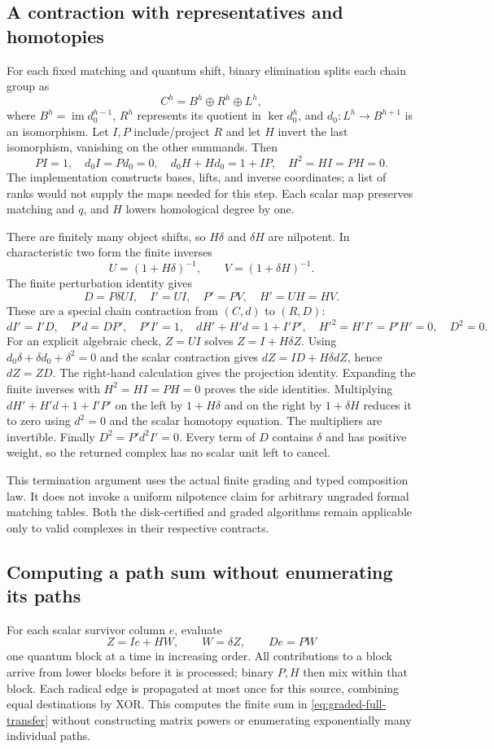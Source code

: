 \subsection{A contraction with representatives and homotopies}
For each fixed matching and quantum shift, binary elimination splits each
chain group as
\[
 C^h=B^h\oplus R^h\oplus L^h,
\]
where $B^h=\operatorname{im}d_0^{h-1}$, $R^h$ represents its quotient
in $\ker d_0^h$, and $d_0:L^h\to B^{h+1}$ is an isomorphism.
Let $I,P$ include/project $R$ and let $H$ invert the last isomorphism,
vanishing on the other summands.  Then
\[
 PI=1,\quad d_0I=Pd_0=0,\quad d_0H+Hd_0=1+IP,
 \quad H^2=HI=PH=0.
\]
The implementation constructs bases, lifts, and inverse coordinates; a
list of ranks would not supply the maps needed for this step.  Each scalar
map preserves matching and $q$, and $H$ lowers homological degree by one.

There are finitely many object shifts, so $H\delta$ and $\delta H$ are
nilpotent.  In characteristic two form the finite inverses
\[
 U=(1+H\delta)^{-1},\qquad V=(1+\delta H)^{-1}.
\]
The finite perturbation identity \cite{crainic-perturbation} gives
\begin{equation}
 D=P\delta UI,\quad I'=UI,\quad P'=PV,\quad H'=UH=HV.
 \label{eq:graded-full-transfer}
\end{equation}
These are a special chain contraction from $(C,d)$ to $(R,D)$:
\[
 dI'=I'D,\quad P'd=DP',\quad P'I'=1,\quad
 dH'+H'd=1+I'P',\quad H'^2=H'I'=P'H'=0,\quad D^2=0.
\]
For an explicit algebraic check, $Z=UI$ solves $Z=I+H\delta Z$.
Using $d_0\delta+\delta d_0+\delta^2=0$ and the scalar contraction gives
$dZ=ID+H\delta dZ$, hence $dZ=ZD$.  The right-hand calculation gives
the projection identity.  Expanding the finite inverses with $H^2=HI=PH=0$
proves the side identities.  Multiplying
$dH'+H'd+1+I'P'$ on the left by $1+H\delta$ and on the right by
$1+\delta H$ reduces it to zero using $d^2=0$ and the scalar homotopy
equation.  The multipliers are invertible.  Finally
$D^2=P'd^2I'=0$.  Every term of $D$ contains $\delta$ and has positive
weight, so the returned complex has no scalar unit left to cancel.

This termination argument uses the actual finite grading and typed
composition law.  It does not invoke a uniform nilpotence claim for
arbitrary ungraded formal matching tables.  Both the disk-certified and
graded algorithms remain applicable only to valid complexes in their
respective contracts.

\subsection{Computing a path sum without enumerating its paths}
For each scalar survivor column $e$, evaluate
\[
 Z=Ie+HW,\qquad W=\delta Z,\qquad De=PW
\]
one quantum block at a time in increasing order.  All contributions to a
block arrive from lower blocks before it is processed; binary $P,H$ then
mix within that block.  Each radical edge is propagated at most once for
this source, combining equal destinations by XOR.  This computes the
finite sum in \eqref{eq:graded-full-transfer} without constructing matrix
powers or enumerating exponentially many individual paths.

